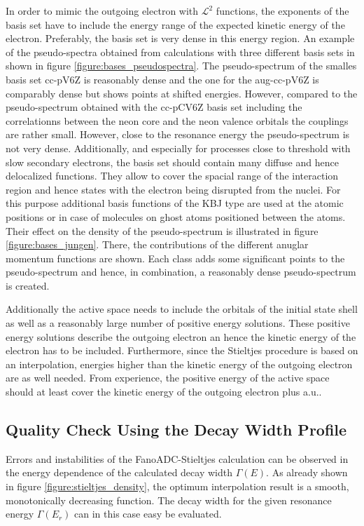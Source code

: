 In order to mimic the outgoing electron with $\mathcal{L}^2$ functions, the
exponents of the basis set have to include the energy range of the expected
kinetic energy of the electron. Preferably, the basis set is very dense in
this energy region. 
An example of the pseudo-spectra obtained from calculations with three
different basis sets in shown in figure \ref{figure:bases_pseudospectra}.
The pseudo-spectrum of the smalles basis set cc-pV6Z is reasonably dense and
the one for the aug-cc-pV6Z is comparably dense but shows points at shifted
energies. However, compared to the pseudo-spectrum obtained with the cc-pCV6Z
basis set including the correlationns between the neon core and the neon valence
orbitals the couplings are rather small. However, close to the resonance energy
the pseudo-spectrum is not very dense.
Additionally, and especially for processes close to threshold     
with slow                                                               
secondary electrons, the basis set should contain many diffuse and hence
delocalized functions.
They allow to cover the spacial range of the interaction
region and hence states with the electron being disrupted from the nuclei.
For this purpose additional basis functions of the \ac{KBJ}\cite{Kaufmann89}
type are used at the atomic positions or in case of molecules on ghost atoms
positioned between the atoms. Their effect on the density of the pseudo-spectrum
is illustrated in figure \ref{figure:bases_jungen}. There, the contributions of the
different anuglar momentum functions are shown. Each class adds some significant
points to the pseudo-spectrum and hence, in combination, a reasonably dense
pseudo-spectrum is created.

Additionally the active space needs to include the orbitals of the initial state
shell as well as a reasonably large number of positive energy solutions. These
positive energy solutions describe the outgoing electron an hence the kinetic energy
of the electron has to be included. Furthermore, since the Stieltjes procedure is
based on an interpolation, energies higher than the kinetic energy of the outgoing
electron are as well needed. From experience, the positive energy of the active
space should at least cover the kinetic energy of the outgoing electron plus
\unit[10]{a.u.}.



\subsection{Quality Check Using the Decay Width Profile}
Errors and instabilities of the FanoADC-Stieltjes calculation can be observed
in the energy dependence of the calculated decay width $\Gamma(E)$.
As already shown in figure \ref{figure:stieltjes_density}, the optimum
interpolation result is a smooth, monotonically decreasing function.
The decay width for the given resonance energy $\Gamma(E_r)$ can in this case easy be
evaluated.

